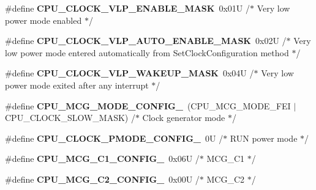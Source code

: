 \begin{DoxyCompactItemize}
\item 
\#define {\bfseries C\+P\+U\+\_\+\+C\+L\+O\+C\+K\+\_\+\+V\+L\+P\+\_\+\+E\+N\+A\+B\+L\+E\+\_\+\+M\+A\+SK}~0x01\+U     /$\ast$ Very low power mode enabled $\ast$/\hypertarget{group___c_p_u___config__module_ga26b49e174d8cdb2559786ca493be301a}{}\label{group___c_p_u___config__module_ga26b49e174d8cdb2559786ca493be301a}

\item 
\#define {\bfseries C\+P\+U\+\_\+\+C\+L\+O\+C\+K\+\_\+\+V\+L\+P\+\_\+\+A\+U\+T\+O\+\_\+\+E\+N\+A\+B\+L\+E\+\_\+\+M\+A\+SK}~0x02\+U     /$\ast$ Very low power mode entered automatically from Set\+Clock\+Configuration method $\ast$/\hypertarget{group___c_p_u___config__module_ga11e646d5670697333e9cc490e665173c}{}\label{group___c_p_u___config__module_ga11e646d5670697333e9cc490e665173c}

\item 
\#define {\bfseries C\+P\+U\+\_\+\+C\+L\+O\+C\+K\+\_\+\+V\+L\+P\+\_\+\+W\+A\+K\+E\+U\+P\+\_\+\+M\+A\+SK}~0x04\+U     /$\ast$ Very low power mode exited after any interrupt $\ast$/\hypertarget{group___c_p_u___config__module_ga9ed1d94ec78831922f508ae8aae918a1}{}\label{group___c_p_u___config__module_ga9ed1d94ec78831922f508ae8aae918a1}

\item 
\#define {\bfseries C\+P\+U\+\_\+\+M\+C\+G\+\_\+\+M\+O\+D\+E\+\_\+\+C\+O\+N\+F\+I\+G\+\_}~(C\+P\+U\+\_\+\+M\+C\+G\+\_\+\+M\+O\+D\+E\+\_\+\+F\+EI $\vert$ C\+P\+U\+\_\+\+C\+L\+O\+C\+K\+\_\+\+S\+L\+O\+W\+\_\+\+M\+A\+SK) /$\ast$ Clock generator mode $\ast$/\hypertarget{group___c_p_u___config__module_ga78e7582637ba844b40035839ca341e8b}{}\label{group___c_p_u___config__module_ga78e7582637ba844b40035839ca341e8b}

\item 
\#define {\bfseries C\+P\+U\+\_\+\+C\+L\+O\+C\+K\+\_\+\+P\+M\+O\+D\+E\+\_\+\+C\+O\+N\+F\+I\+G\+\_}~0\+U /$\ast$ R\+U\+N power mode $\ast$/\hypertarget{group___c_p_u___config__module_gacaa8315c49950c18899f30af1d4a5074}{}\label{group___c_p_u___config__module_gacaa8315c49950c18899f30af1d4a5074}

\item 
\#define {\bfseries C\+P\+U\+\_\+\+M\+C\+G\+\_\+\+C1\+\_\+\+C\+O\+N\+F\+I\+G\+\_}~0x06\+U /$\ast$ M\+C\+G\+\_\+\+C1 $\ast$/\hypertarget{group___c_p_u___config__module_gae4463a8e0dc471348c280957ebca2d9d}{}\label{group___c_p_u___config__module_gae4463a8e0dc471348c280957ebca2d9d}

\item 
\#define {\bfseries C\+P\+U\+\_\+\+M\+C\+G\+\_\+\+C2\+\_\+\+C\+O\+N\+F\+I\+G\+\_}~0x00\+U /$\ast$ M\+C\+G\+\_\+\+C2 $\ast$/\hypertarget{group___c_p_u___config__module_gacb3dfde4c8fb508d484121f8b136c90c}{}\label{group___c_p_u___config__module_gacb3dfde4c8fb508d484121f8b136c90c}


\end{DoxyCompactItemize}
